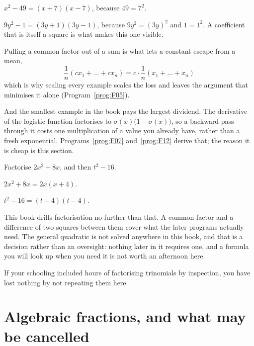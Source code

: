 \begin{fr}
\begin{ansblock}
$x^{2} - 49 = (x + 7)(x - 7)$, because $49 = 7^{2}$.

$9y^{2} - 1 = (3y + 1)(3y - 1)$, because $9y^{2} = (3y)^{2}$ and $1 = 1^{2}$.
A coefficient that is itself a square is what makes this one visible.
\end{ansblock}

\begin{aibox}
Pulling a common factor out of a sum is what lets a constant escape from a
mean,
\[ \frac{1}{n}(cx_{1} + \dots + cx_{n})
   = c \cdot \frac{1}{n}(x_{1} + \dots + x_{n}) \]
which is why scaling every example scales the loss and leaves the argument that
minimises it alone (Program~\ref{prog:F05}).

And the smallest example in the book pays the largest dividend. The derivative
of the logistic function factorises to $\sigma(x)\bigl(1 - \sigma(x)\bigr)$, so
a backward pass through it costs one multiplication of a value you already
have, rather than a fresh exponential. Programs~\ref{prog:F07}
and~\ref{prog:F12} derive that; the reason it is cheap is this section.
\end{aibox}

\yourturn
Factorise $2x^{2} + 8x$, and then $t^{2} - 16$.
\dotline
\nextframe
\end{fr}

\begin{fr}
\begin{ansblock}
$2x^{2} + 8x = 2x(x + 4)$.

$t^{2} - 16 = (t + 4)(t - 4)$.
\end{ansblock}

\begin{note}
This book drills factorisation no further than that. A common factor and a
difference of two squares between them cover what the later programs actually
need. The general quadratic is not solved anywhere in this book, and that is
a decision rather than an oversight: nothing later in it requires one, and a
formula you will look up when you need it is not worth an afternoon here.

If your schooling included hours of factorising trinomials by inspection, you
have lost nothing by not repeating them here.
\end{note}
\end{fr}

\section{Algebraic fractions, and what may be cancelled}
\label{sec:F02-fractions}

